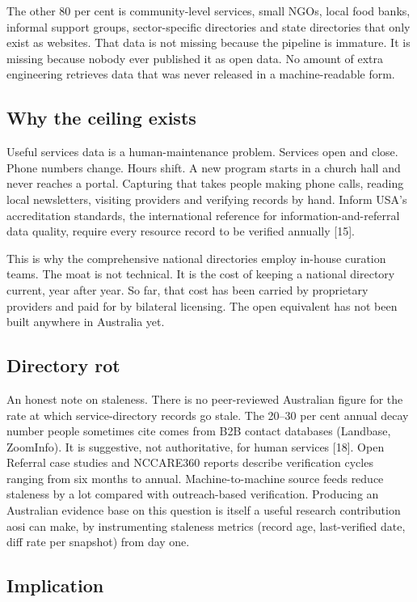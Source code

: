 \documentclass[11pt,a4paper]{article}
\begin{document}
The other 80 per cent is community-level services, small NGOs, local food banks, informal support groups, sector-specific directories and state directories that only exist as websites. That data is not missing because the pipeline is immature. It is missing because nobody ever published it as open data. No amount of extra engineering retrieves data that was never released in a machine-readable form.

\subsection{Why the ceiling exists}

Useful services data is a human-maintenance problem. Services open and close. Phone numbers change. Hours shift. A new program starts in a church hall and never reaches a portal. Capturing that takes people making phone calls, reading local newsletters, visiting providers and verifying records by hand. Inform USA's accreditation standards, the international reference for information-and-referral data quality, require every resource record to be verified annually [15].

This is why the comprehensive national directories employ in-house curation teams. The moat is not technical. It is the cost of keeping a national directory current, year after year. So far, that cost has been carried by proprietary providers and paid for by bilateral licensing. The open equivalent has not been built anywhere in Australia yet.

\subsection{Directory rot}

An honest note on staleness. There is no peer-reviewed Australian figure for the rate at which service-directory records go stale. The 20--30 per cent annual decay number people sometimes cite comes from B2B contact databases (Landbase, ZoomInfo). It is suggestive, not authoritative, for human services [18]. Open Referral case studies and NCCARE360 reports describe verification cycles ranging from six months to annual. Machine-to-machine source feeds reduce staleness by a lot compared with outreach-based verification. Producing an Australian evidence base on this question is itself a useful research contribution aosi can make, by instrumenting staleness metrics (record age, last-verified date, diff rate per snapshot) from day one.

\subsection{Implication}
\end{document}
